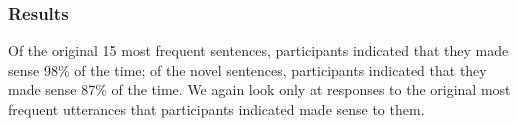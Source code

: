 \documentclass[linguex]{sp}
\newcommand{\ndg}[1]{\textcolor{Green}{[ndg: #1]}}
\begin{document}
%
%
%
%

\subsubsection{Results}

Of the original 15 most frequent sentences, participants indicated that they made sense 98\% of the time; of the novel sentences, participants indicated that they made sense 87\% of the time.
We again look only at responses to the original most frequent utterances that participants indicated made sense to them.
\end{document}
